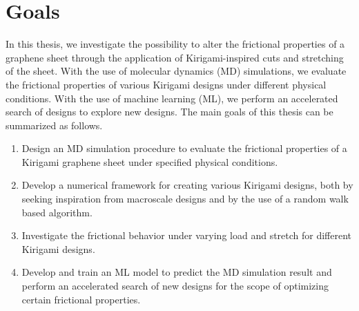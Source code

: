 \section{Goals} %
In this thesis, we investigate the possibility to alter the frictional
properties of a graphene sheet through the application of Kirigami-inspired cuts and stretching of the sheet. With the use of molecular dynamics (\acrshort{MD}) simulations, we evaluate the frictional properties of various Kirigami designs under different physical conditions. With the use of machine learning (\acrshort{ML}), we perform an accelerated search of designs to explore new designs. The main goals of this thesis can be summarized as follows.
\begin{enumerate} 
    \item Design an \acrshort{MD} simulation procedure to evaluate the frictional properties of a Kirigami graphene sheet under specified physical conditions.
    \item Develop a numerical framework for creating various Kirigami designs, both by seeking inspiration from macroscale designs and by the use of a random walk based algorithm.
    \item Investigate the frictional behavior under varying load and stretch for different Kirigami designs.
    \item Develop and train an \acrshort{ML} model to predict the \acrshort{MD} simulation result and perform an accelerated search of new designs for the scope of optimizing certain frictional properties.
\end{enumerate}





